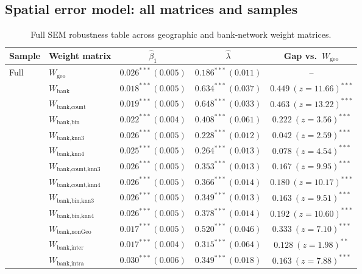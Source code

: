 \subsection{Spatial error model: all matrices and samples}
\begin{table}[htbp]
  \centering
  \caption{Full SEM robustness table across geographic and bank-network weight matrices.}
  \label{tab:sem-full}
  \footnotesize
  \begin{tabular}{llccc}
    \toprule
    Sample & Weight matrix & $\hat\beta_1$ & $\hat\lambda$ & Gap vs.\ $W_{\text{geo}}$ \\
    \midrule
    Full & $W_{\text{geo}}$ & $0.026^{***}\,(0.005)$ & $0.186^{***}\,(0.011)$ & -- \\
     & $W_{\text{bank}}$ & $0.018^{***}\,(0.005)$ & $0.634^{***}\,(0.037)$ & $0.449\ (z{=}11.66)^{***}$ \\
     & $W_{\text{bank,count}}$ & $0.019^{***}\,(0.005)$ & $0.648^{***}\,(0.033)$ & $0.463\ (z{=}13.22)^{***}$ \\
     & $W_{\text{bank,bin}}$ & $0.022^{***}\,(0.004)$ & $0.408^{***}\,(0.061)$ & $0.222\ (z{=}3.56)^{***}$ \\
     & $W_{\text{bank,knn3}}$ & $0.026^{***}\,(0.005)$ & $0.228^{***}\,(0.012)$ & $0.042\ (z{=}2.59)^{***}$ \\
     & $W_{\text{bank,knn4}}$ & $0.025^{***}\,(0.005)$ & $0.264^{***}\,(0.013)$ & $0.078\ (z{=}4.54)^{***}$ \\
     & $W_{\text{bank,count,knn3}}$ & $0.026^{***}\,(0.005)$ & $0.353^{***}\,(0.013)$ & $0.167\ (z{=}9.95)^{***}$ \\
     & $W_{\text{bank,count,knn4}}$ & $0.026^{***}\,(0.005)$ & $0.366^{***}\,(0.014)$ & $0.180\ (z{=}10.17)^{***}$ \\
     & $W_{\text{bank,bin,knn3}}$ & $0.026^{***}\,(0.005)$ & $0.349^{***}\,(0.013)$ & $0.163\ (z{=}9.51)^{***}$ \\
     & $W_{\text{bank,bin,knn4}}$ & $0.026^{***}\,(0.005)$ & $0.378^{***}\,(0.014)$ & $0.192\ (z{=}10.60)^{***}$ \\
     & $W_{\text{bank,nonGeo}}$ & $0.017^{***}\,(0.005)$ & $0.520^{***}\,(0.046)$ & $0.333\ (z{=}7.10)^{***}$ \\
     & $W_{\text{bank,inter}}$ & $0.017^{***}\,(0.004)$ & $0.315^{***}\,(0.064)$ & $0.128\ (z{=}1.98)^{**}$ \\
     & $W_{\text{bank,intra}}$ & $0.030^{***}\,(0.006)$ & $0.349^{***}\,(0.018)$ & $0.163\ (z{=}7.88)^{***}$ \\

\end{tabular}
\end{table}
